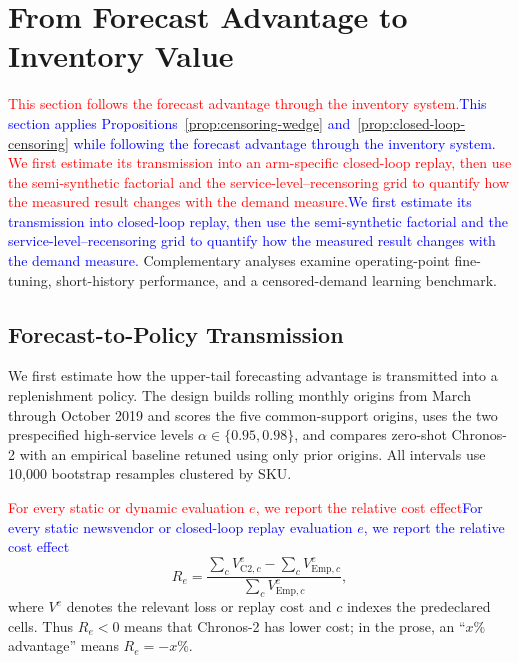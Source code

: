 \documentclass[msom,dblanonrev]{informs4}
\newcommand{\add}[1]{\textcolor{blue}{#1}}
\newcommand{\reduce}[1]{\textcolor{red}{#1}\hspace{0.5em}}
\begin{document}
\section{From Forecast Advantage to Inventory Value}\label{sec:robustness}

\reduce{This section follows the forecast advantage through the inventory system.}\add{This section applies Propositions~\ref{prop:censoring-wedge} and~\ref{prop:closed-loop-censoring} while following the forecast advantage through the inventory system.}
\reduce{We first estimate its transmission into an arm-specific closed-loop replay, then use the semi-synthetic factorial and the service-level--recensoring grid to quantify how the measured result changes with the demand measure.}\add{We first estimate its transmission into closed-loop replay, then use the semi-synthetic factorial and the service-level--recensoring grid to quantify how the measured result changes with the demand measure.}
Complementary analyses examine operating-point fine-tuning, short-history performance, and a censored-demand learning benchmark.

\subsection{Forecast-to-Policy Transmission}\label{sec:transmission}

We first estimate how the upper-tail forecasting advantage is transmitted into a replenishment policy.
The design builds rolling monthly origins from March through October 2019 and scores the five common-support origins, uses the two prespecified high-service levels $\alpha\in\{0.95,0.98\}$, and compares zero-shot Chronos-2 with an empirical baseline retuned using only prior origins.
All intervals use 10{,}000 bootstrap resamples clustered by SKU.

\reduce{For every static or dynamic evaluation $e$, we report the relative cost effect}\add{For every static newsvendor or closed-loop replay evaluation $e$, we report the relative cost effect}
\begin{equation}\label{eq:relative_effect}
R_e=\frac{\sum_c V^{e}_{\mathrm{C2},c}-\sum_c V^{e}_{\mathrm{Emp},c}}
          {\sum_c V^{e}_{\mathrm{Emp},c}},
\end{equation}
where $V^e$ denotes the relevant loss or replay cost and $c$ indexes the predeclared cells.
Thus $R_e<0$ means that Chronos-2 has lower cost; in the prose, an ``$x\%$ advantage'' means $R_e=-x\%$.
\end{document}
